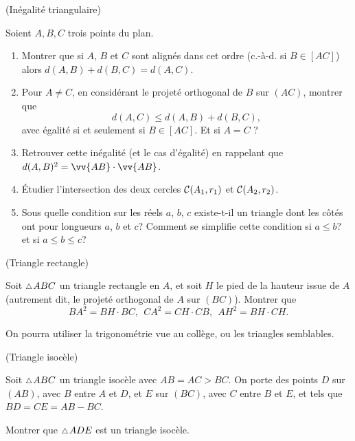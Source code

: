 \documentclass[a4paper,11pt,reqno]{amsart}
\begin{document}
\begin{exo} (Inégalité triangulaire)

  Soient $A,B,C$ trois points du plan.
  \begin{enumerate}
    \item Montrer que si $A$, $B$ et $C$ sont alignés dans cet ordre (c.-à-d. si $B \in [AC]$) alors $d(A,B)+d(B,C)=d(A,C)$.
    \item Pour $A \neq C$, en considérant le projeté orthogonal de $B$ sur $(AC)$, montrer que
    \[
      d(A,C) \leqslant d(A,B)+d(B,C),
    \]
    avec égalité si et seulement si $B \in [AC]$. Et si $A=C$ ?
    \item Retrouver cette inégalité (et le cas d'égalité) en rappelant que $d(A,B)^{2}=\vv{AB}\cdot\vv{AB}$.
    \item Étudier l'intersection des deux cercles $\mathcal{C}(A_1,r_1)$ et $\mathcal{C}(A_2,r_2)$.
    \item Sous quelle condition sur les réels $a$, $b$, $c$ existe-t-il un triangle dont les côtés ont pour longueurs $a$, $b$ et $c$? Comment se simplifie cette condition si $a \leqslant b$? et si $a \leqslant b \leqslant c$?
  \end{enumerate}
\end{exo}


\begin{exo} (Triangle rectangle)

  Soit $\tri ABC$ un triangle rectangle en $A$, et soit $H$ le pied de la hauteur issue de $A$ (autrement dit, le projeté orthogonal de $A$ sur $(BC)$).  Montrer que
  \[
    BA^2=BH \cdot BC,\ \ CA^2=CH \cdot CB,\ \ AH^2=BH \cdot CH.
  \]
  \begin{indication}
    On pourra utiliser la trigonométrie vue au collège, ou les triangles semblables.
  \end{indication}
\end{exo}


\begin{exo} (Triangle isocèle)

  Soit $\tri ABC$ un triangle isocèle avec $AB=AC > BC$. On porte des points $D$ sur $(AB)$, avec $B$ entre $A$ et $D$, et $E$ sur $(BC)$, avec $C$ entre $B$ et $E$, et tels que $BD=CE=AB-BC$.

  Montrer que $\tri ADE$ est un triangle isocèle.
\end{exo}


\end{document}
